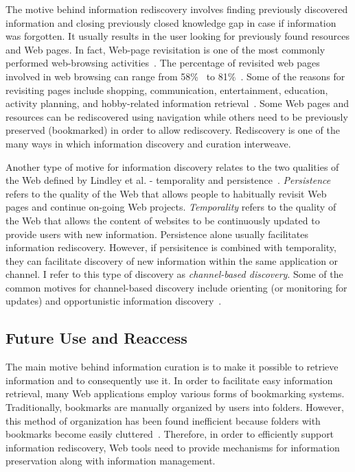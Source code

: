 {{The motive behind information rediscovery involves finding previously discovered information and closing previously closed knowledge gap in case if information was forgotten. It usually results in the user looking for previously found resources and Web pages. In fact, Web-page revisitation is one of the most commonly performed web-browsing activities~\cite{adar2008large,cockburn2003improving}. The percentage of revisited web pages involved in web browsing can range from 58\%~\cite{tauscher1997people} to 81\%~\cite{cockburn2001web}. Some of the reasons for revisiting pages include shopping, communication, entertainment, education, activity planning, and hobby-related information retrieval~\cite{adar2008large}. Some Web pages and resources can be rediscovered using navigation while others need to be previously preserved (bookmarked) in order to allow rediscovery. Rediscovery is one of the many ways in which information discovery and curation interweave. 

Another type of motive for information discovery relates to the two qualities of the Web defined by Lindley et al. - temporality and persistence~\citep{lindley2012s}. \textit{Persistence} refers to the quality of the Web that allows people to habitually revisit Web pages and continue on-going Web projects. \textit{Temporality} refers to the quality of the Web that allows the content of websites to be continuously updated to provide users with new information. Persistence alone usually facilitates information rediscovery. However, if persisitence is combined with temporality, they can facilitate discovery of new information within the same application or channel. I refer to this type of discovery as \textit{channel-based discovery}. Some of the common motives for channel-based discovery include orienting (or monitoring for updates) and opportunistic information discovery~\citep{lindley2012s}.          
}

{\subsection{Future Use and Reaccess}
The main motive behind information curation is to make it possible to retrieve information and to consequently use it. In order to facilitate easy information retrieval, many Web applications employ various forms of bookmarking systems. Traditionally, bookmarks are manually organized by users into folders. However, this method of organization has been found inefficient because folders with bookmarks become easily cluttered~\cite{abrams1998information}. Therefore, in order to efficiently support information rediscovery, Web tools need to provide mechanisms for information preservation along with information management.
}

}
